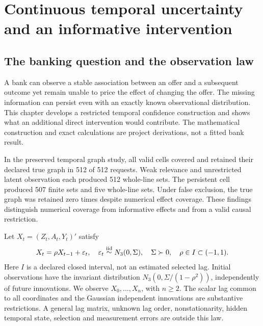 \chapter{Continuous temporal uncertainty and an informative intervention}
\label{exec13:temporal-region}

\hypertarget{the-banking-question-and-the-observation-law}{%
\section{The banking question and the observation
law}\label{the-banking-question-and-the-observation-law}}

A bank can observe a stable association between an offer and a
subsequent outcome yet remain unable to price the effect of changing the
offer. The missing information can persist even with an exactly known
observational distribution. This chapter develops a restricted temporal
confidence construction and shows what an additional direct intervention
would contribute. The mathematical construction and exact calculations
are project derivations, not a fitted bank result.
\citep{exec13_temporal_argument,exec13_temporal_exact}

In the preserved temporal graph study, all valid cells covered and
retained their declared true graph in 512 of 512 requests. Weak
relevance and unrestricted latent observation each produced 512
whole-line sets. The persistent cell produced 507 finite sets and five
whole-line sets. Under false exclusion, the true graph was retained zero
times despite numerical effect coverage. These findings distinguish
numerical coverage from informative effects and from a valid causal
restriction. \citep{exec13_temporal_predecessor}

Let \(X_t=(Z_t,A_t,Y_t)'\) satisfy \[
 X_t=\rho X_{t-1}+\varepsilon_t,\quad
 \varepsilon_t\mathrel{\mathop\sim^{\rm iid}}N_3(0,\Sigma),\quad
 \Sigma\succ0,\quad \rho\in I\subset(-1,1).
\] Here \(I\) is a declared closed interval, not an estimated selected
lag. Initial observations have the invariant distribution
\(N_3(0,\Sigma/(1-\rho^2))\), independently of future innovations. We
observe \(X_0,\ldots,X_n\), with \(n\ge2\). The scalar lag common to all
coordinates and the Gaussian independent innovations are substantive
restrictions. A general lag matrix, unknown lag order, nonstationarity,
hidden temporal state, selection and measurement errors are outside this
law.

